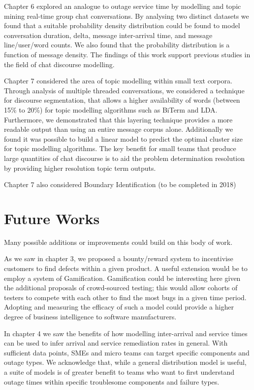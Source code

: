 Chapter 6 explored an analogue to outage service time by modelling and topic mining real-time group chat conversations. By analysing two distinct datasets we found that a suitable probability density distribution could be found to model conversation duration, delta, message inter-arrival time, and message line/user/word counts. We also found that the probability distribution is a function of message density. The findings of this work support previous studies in the field of chat discourse modelling. 

Chapter 7 considered the area of topic modelling within small text corpora. Through analysis of multiple threaded conversations, we considered a technique for discourse segmentation, that allows a higher availability of words (between 15\% to 20\%) for topic modelling algorithms such as BiTerm and LDA. Furthermore, we demonstrated that this layering technique provides a more readable output than using an entire message corpus alone. Additionally we found it was possible to build a linear model to predict the optimal cluster size for topic modelling algorithms. The key benefit for small teams that produce large quantities of chat discourse is to aid the problem determination resolution by providing higher resolution topic term outputs.

Chapter 7 also considered Boundary Identification (to be completed in 2018)


\section{Future Works}

Many possible additions or improvements could build on this body of work.

As we saw in chapter 3, we proposed a bounty/reward system to incentivise customers to find defects within a given product. A useful extension would be to employ a system of Gamification\cite{huotari2012defining}. Gamification could be interesting here given the additional proposals of crowd-sourced testing; this would allow cohorts of testers to compete with each other to find the most bugs in a given time period. Adopting and measuring the efficacy of such a model could provide a higher degree of business intelligence to software manufacturers.

In chapter 4 we saw the benefits of how modelling inter-arrival and service times can be used to infer arrival and service remediation rates in general. With sufficient data points, SMEs and micro teams can target specific components and outage types. We acknowledge that, while a general distribution model is useful, a suite of models is of greater benefit to teams who want to first understand outage times within specific troublesome components and failure types.

